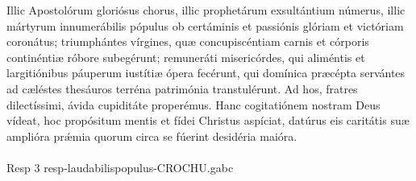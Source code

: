 \documentclass[options]{article}
\begin{document}
      Illic Apostolórum gloriósus chorus, illic prophetárum exsultántium númerus, illic mártyrum innumerábilis pópulus ob certáminis et passiónis glóriam et victóriam coronátus; triumphántes vírgines, quæ concupiscéntiam carnis et córporis continéntiæ róbore subegérunt; remuneráti misericórdes, qui aliméntis et largitiónibus páuperum iustítiæ ópera fecérunt, qui domínica præcépta servántes ad cæléstes thesáuros terréna patrimónia transtulérunt. Ad hos, fratres dilectíssimi, ávida cupiditáte properémus. Hanc cogitatiónem nostram Deus vídeat, hoc propósitum mentis et fídei Christus aspíciat, datúrus eis caritátis suæ amplióra pr\'{æ}mia quorum circa se fúerint desidéria maióra. \\
      \\
      Resp 3 resp-laudabilispopulus-CROCHU.gabc
	
\end{document}
